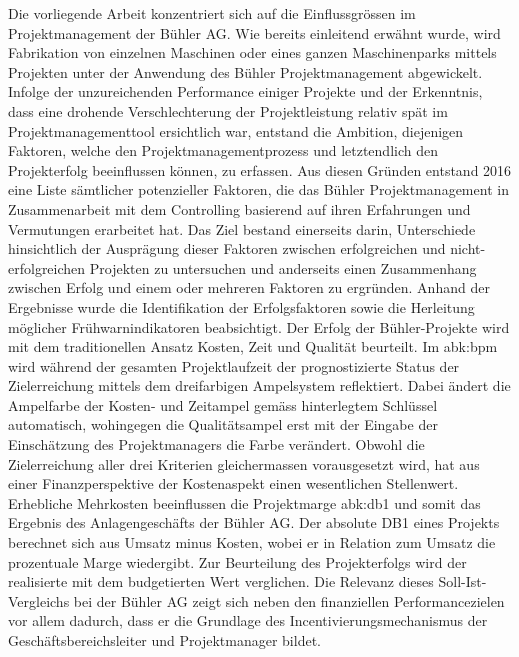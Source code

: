 Die vorliegende Arbeit konzentriert sich auf die Einflussgrössen im Projektmanagement der Bühler AG. Wie bereits einleitend erwähnt wurde, wird Fabrikation von einzelnen Maschinen oder eines ganzen Maschinenparks mittels Projekten unter der Anwendung des Bühler Projektmanagement abgewickelt. Infolge der unzureichenden Performance einiger Projekte und der Erkenntnis, dass eine drohende Verschlechterung der Projektleistung relativ spät im Projektmanagementtool ersichtlich war, entstand die Ambition, diejenigen Faktoren, welche den Projektmanagementprozess und letztendlich den Projekterfolg beeinflussen können, zu erfassen. Aus diesen Gründen entstand 2016 eine Liste sämtlicher potenzieller Faktoren, die das Bühler Projektmanagement in Zusammenarbeit mit dem Controlling basierend auf ihren Erfahrungen und Vermutungen erarbeitet hat. Das Ziel bestand einerseits darin, Unterschiede hinsichtlich der Ausprägung dieser Faktoren zwischen erfolgreichen und nicht-erfolgreichen Projekten zu untersuchen und anderseits einen Zusammenhang zwischen Erfolg und einem oder mehreren Faktoren zu ergründen. Anhand der Ergebnisse wurde die Identifikation der Erfolgsfaktoren sowie die Herleitung möglicher Frühwarnindikatoren beabsichtigt.
\newline \newline Der Erfolg der Bühler-Projekte wird mit dem traditionellen Ansatz Kosten, Zeit und Qualität beurteilt. Im \gls{abk:bpm} wird während der gesamten Projektlaufzeit der prognostizierte Status der Zielerreichung mittels dem dreifarbigen Ampelsystem reflektiert. Dabei ändert die Ampelfarbe der Kosten- und Zeitampel gemäss hinterlegtem Schlüssel automatisch, wohingegen die Qualitätsampel erst mit der Eingabe der Einschätzung des Projektmanagers die Farbe verändert. Obwohl die Zielerreichung aller drei Kriterien gleichermassen vorausgesetzt wird, hat aus einer Finanzperspektive der Kostenaspekt einen wesentlichen Stellenwert. Erhebliche Mehrkosten beeinflussen die Projektmarge \gls{abk:db1} und somit das Ergebnis des Anlagengeschäfts der Bühler AG. Der absolute DB1 eines Projekts berechnet sich aus Umsatz minus Kosten, wobei er in Relation zum Umsatz die prozentuale Marge wiedergibt. Zur Beurteilung des Projekterfolgs wird der realisierte mit dem budgetierten Wert verglichen. Die Relevanz dieses Soll-Ist-Vergleichs bei der Bühler AG zeigt sich neben den finanziellen Performancezielen vor allem dadurch, dass er die Grundlage des Incentivierungsmechanismus der Geschäftsbereichsleiter und Projektmanager bildet. 
